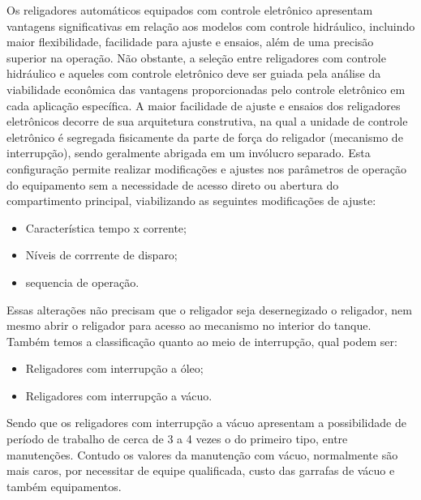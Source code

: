 \documentclass[oneside,openright,12pt]{ufsm_2021} %
\begin{document}
\par Os religadores automáticos equipados com controle eletrônico apresentam vantagens significativas em relação aos modelos com controle hidráulico, incluindo maior flexibilidade, facilidade para ajuste e ensaios, além de uma precisão superior na operação. Não obstante, a seleção entre religadores com controle hidráulico e aqueles com controle eletrônico deve ser guiada pela análise da viabilidade econômica das vantagens proporcionadas pelo controle eletrônico em cada aplicação específica. A maior facilidade de ajuste e ensaios dos religadores eletrônicos decorre de sua arquitetura construtiva, na qual a unidade de controle eletrônico é segregada fisicamente da parte de força do religador (mecanismo de interrupção), sendo geralmente abrigada em um invólucro separado. Esta configuração permite realizar modificações e ajustes nos parâmetros de operação do equipamento sem a necessidade de acesso direto ou abertura do compartimento principal, viabilizando as seguintes modificações de ajuste:

\begin{itemize}
	\item Característica tempo x corrente;
	\item Níveis de corrrente de disparo;
	\item sequencia de operação.
\end{itemize}

\par Essas alterações não precisam que o religador seja desernegizado o religador, nem mesmo abrir o religador para acesso ao mecanismo no interior do tanque. Também temos a classificação quanto ao meio de interrupção, qual podem ser:
\begin{itemize}
	\item Religadores com interrupção a óleo;
	\item Religadores com interrupção a vácuo.
\end{itemize}

\par Sendo que os religadores com interrupção a vácuo apresentam a possibilidade de período de trabalho de cerca de 3 a 4 vezes o do primeiro tipo, entre manutenções. Contudo os valores da manutenção com vácuo, normalmente são mais caros, por necessitar de equipe qualificada, custo das garrafas de vácuo e também equipamentos.






\end{document}
